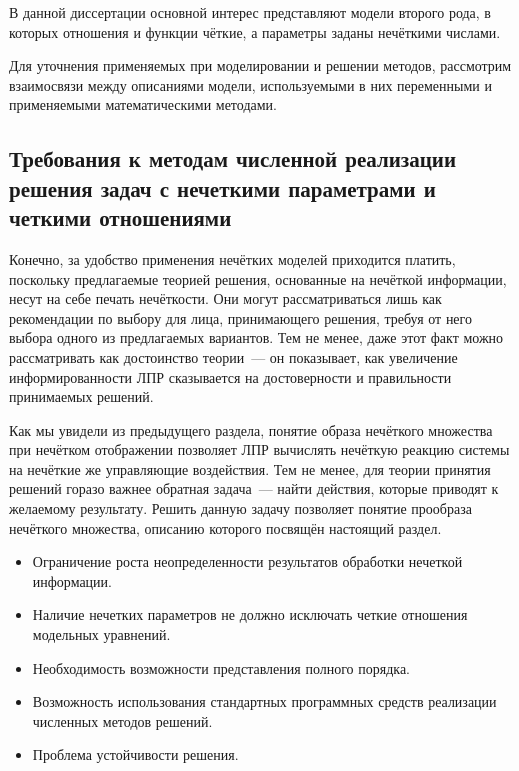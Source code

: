 В данной диссертации основной интерес представляют модели второго рода, в которых отношения и функции чёткие, а параметры заданы нечёткими числами.

Для уточнения применяемых при моделировании и решении методов, рассмотрим взаимосвязи между описаниями модели, используемыми в них переменными и применяемыми математическими методами.




\subsection{Требования к методам численной реализации решения задач с нечеткими параметрами и четкими отношениями}

Конечно, за удобство применения нечётких моделей приходится платить, поскольку предлагаемые теорией решения, основанные на нечёткой информации, несут на себе печать нечёткости. Они могут рассматриваться лишь как рекомендации по выбору для лица, принимающего решения, требуя от него выбора одного из предлагаемых вариантов. Тем не менее, даже этот факт можно рассматривать как достоинство теории~--- он показывает, как увеличение информированности ЛПР сказывается на достоверности и правильности принимаемых решений.

Как мы увидели из предыдущего раздела, понятие образа нечёткого множества при нечётком отображении позволяет ЛПР вычислять нечёткую реакцию системы на нечёткие же управляющие воздействия. Тем не менее, для теории принятия решений горазо важнее обратная задача~--- найти действия, которые приводят к желаемому результату. Решить данную задачу позволяет понятие прообраза нечёткого множества, описанию которого посвящён настоящий раздел.

\begin{itemize}
	\item Ограничение роста неопределенности результатов обработки нечеткой информации.
	\item Наличие нечетких параметров не должно исключать четкие отношения модельных уравнений.
	\item Необходимость возможности представления полного порядка.
	\item Возможность использования стандартных программных средств реализации численных методов решений.
	\item Проблема устойчивости решения.
\end{itemize}